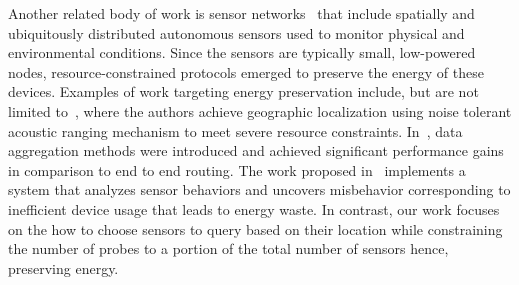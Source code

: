 \documentclass{acm_proc_article-sp}
\begin{document}
Another related body of work is sensor networks~\cite{akyildiz2002survey} that include spatially and ubiquitously distributed autonomous sensors used to monitor physical and environmental conditions. Since the sensors are typically small, low-powered nodes, resource-constrained protocols emerged to preserve the energy of these devices. Examples of work targeting energy preservation include, but are not limited to~\cite{sallai2004acoustic}, where the authors achieve geographic localization using noise tolerant acoustic ranging mechanism to meet severe resource constraints. In~\cite{krishnamachari2002impact}, data aggregation methods were introduced and achieved significant performance gains in comparison to end to end routing. The work proposed in~\cite{fontugne2013strip} implements a system that analyzes sensor behaviors and uncovers misbehavior corresponding to inefficient device usage that leads to energy waste. In contrast, our work focuses on the how to choose sensors to query based on their location while constraining the number of probes to a portion of the total number of sensors hence, preserving energy.
\end{document}

